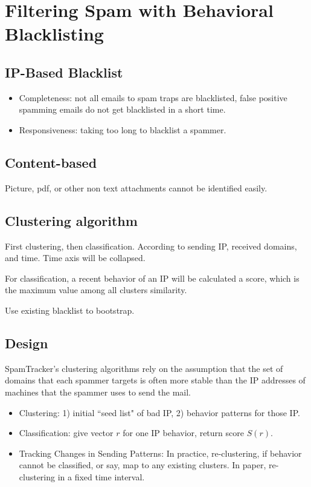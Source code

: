 \documentclass[]{article}
\begin{document}
\section{Filtering Spam with Behavioral Blacklisting}

\subsection{IP-Based Blacklist}
\begin{itemize}
 \item Completeness: not all emails to spam traps are blacklisted, 
 false positive spamming emails do not get blacklisted in a short time.
 \item Responsiveness: taking too long to blacklist a spammer.
\end{itemize}

\subsection{Content-based}
Picture, pdf, or other non text attachments cannot be identified 
easily.

\subsection{Clustering algorithm}
First clustering, then classification. According to sending IP, received 
domains, and time. Time axis will be collapsed.

For classification, a recent behavior of an IP will be calculated a score,
which is the maximum value among all clusters similarity.

Use existing blacklist to bootstrap. 
 
\subsection{Design}
SpamTracker’s clustering algorithms rely on the assumption that the set 
of domains that each spammer targets is often more stable than the IP
 addresses of machines that the spammer uses to send the mail.
 
\begin{itemize}
 \item Clustering: 1) initial ``seed list" of bad IP, 2) behavior patterns
 for those IP. 
 \item Classification: give vector $r$ for one IP behavior, return score
 $S(r)$.
 \item Tracking Changes in Sending Patterns: In practice, re-clustering, 
 if behavior  cannot be classified, or say, map to any existing clusters. 
 In paper, re-clustering in a fixed time interval.
\end{itemize}
\end{document}
